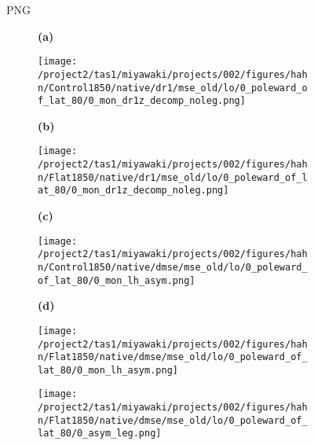 \documentclass[preview]{standalone}
\begin{document}
\begin{figure}
%       

PNG

  \begin{subfigure}[t]{0.05\textwidth}
    \textbf{\small{(a)}}
  \end{subfigure}
  \begin{subfigure}[t]{0.45\textwidth}
    \texttt{[image: /project2/tas1/miyawaki/projects/002/figures/hahn/Control1850/native/dr1/mse\_old/lo/0\_poleward\_of\_lat\_80/0\_mon\_dr1z\_decomp\_noleg.png]}
  \end{subfigure}
  \begin{subfigure}[t]{0.05\textwidth}
    \textbf{\small{(b)}}
  \end{subfigure}
  \begin{subfigure}[t]{0.45\textwidth}
    \texttt{[image: /project2/tas1/miyawaki/projects/002/figures/hahn/Flat1850/native/dr1/mse\_old/lo/0\_poleward\_of\_lat\_80/0\_mon\_dr1z\_decomp\_noleg.png]}
  \end{subfigure}

  \begin{subfigure}[t]{0.05\textwidth}
    \textbf{\small{(c)}}
  \end{subfigure}
  \begin{subfigure}[t]{0.45\textwidth}
    \texttt{[image: /project2/tas1/miyawaki/projects/002/figures/hahn/Control1850/native/dmse/mse\_old/lo/0\_poleward\_of\_lat\_80/0\_mon\_lh\_asym.png]}
  \end{subfigure}
  \begin{subfigure}[t]{0.05\textwidth}
    \textbf{\small{(d)}}
  \end{subfigure}
  \begin{subfigure}[t]{0.45\textwidth}
    \texttt{[image: /project2/tas1/miyawaki/projects/002/figures/hahn/Flat1850/native/dmse/mse\_old/lo/0\_poleward\_of\_lat\_80/0\_mon\_lh\_asym.png]}
  \end{subfigure}

  \begin{subfigure}[t]{0.14\textwidth}
    \hfill
  \end{subfigure}
  \begin{subfigure}[t]{0.75\textwidth}
    \texttt{[image: /project2/tas1/miyawaki/projects/002/figures/hahn/Flat1850/native/dmse/mse\_old/lo/0\_poleward\_of\_lat\_80/0\_asym\_leg.png]}
  \end{subfigure}

\end{figure}
\end{document}
